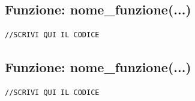 \subsection{Funzione: nome\_funzione(...)}
\begin{lstlisting}[language=Arduino]
//SCRIVI QUI IL CODICE
\end{lstlisting}
\noindent\makebox[\linewidth]{\rule{15mm}{.4mm}}


\subsection{Funzione: nome\_funzione(...)}
\begin{lstlisting}[language=Arduino]
//SCRIVI QUI IL CODICE
\end{lstlisting}
\noindent\makebox[\linewidth]{\rule{15mm}{.4mm}}